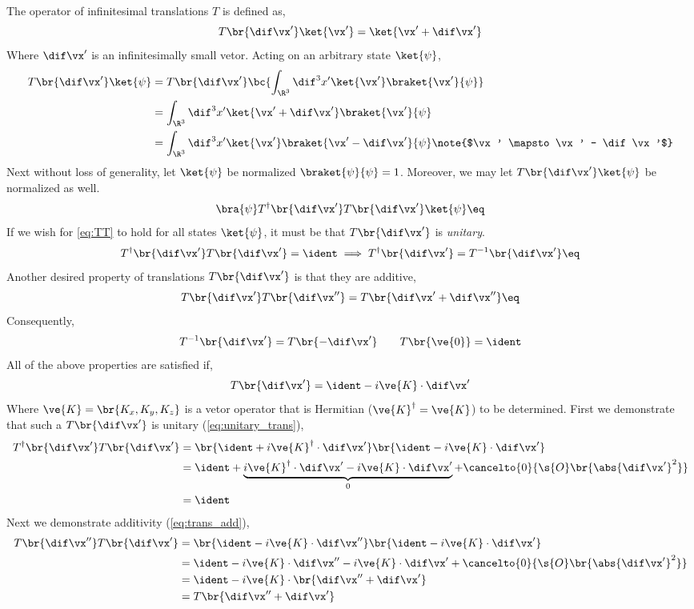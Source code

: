 \documentclass{article}
\begin{document}
The operator of infinitesimal translations $T$ is defined as,
\[ T\br{\dif \vx'}\ket{\vx'} = \ket{\vx' + \dif \vx'} \]
Where $\dif \vx'$ is an infinitesimally small vetor. Acting on an arbitrary state $\ket{\psi}$,
\begin{align*}
T\br{\dif \vx'}\ket{\psi} &= T\br{\dif \vx'} \bc{\int_{\R^3} \dif^3 x' \ket{\vx'} \braket{\vx'}{\psi}} \\
&= \int_{\R^3} \dif^3 x' \ket{\vx' + \dif \vx'} \braket{\vx'}{\psi} \\
&= \int_{\R^3} \dif^3 x' \ket{\vx'} \braket{\vx' - \dif \vx'}{\psi} \note{$\vx' \mapsto \vx' - \dif \vx'$}\\
\end{align*}
Next without loss of generality, let $\ket{\psi}$ be normalized $\braket{\psi}{\psi} = 1$. Moreover, we may let $T\br{\dif \vx'}\ket{\psi}$ be normalized as well.
\[ \bra{\psi}T^{\dagger}\br{\dif \vx'} T\br{\dif \vx'}\ket{\psi} \eq \label{eq:TT}\]
If we wish for \cref{eq:TT} to hold for all states $\ket{\psi}$, it must be that $T\br{\dif \vx'}$ is \textit{unitary}.
\[ T^{\dagger}\br{\dif \vx'} T\br{\dif \vx'} = \ident \implies T^{\dagger}\br{\dif \vx'} = T^{-1}\br{\dif \vx'} \eq\label{eq:unitary_trans}\]
Another desired property of translations $T\br{\dif \vx'}$ is that they are additive,
\[ T\br{\dif \vx'}T\br{\dif \vx''} = T\br{\dif \vx' + \dif \vx''} \eq \label{eq:trans_add}\]
Consequently,
\[ T^{-1}\br{\dif \vx'} = T\br{-\dif \vx'} \qquad T\br{\ve{0}} = \ident \]
All of the above properties are satisfied if,
\[ T\br{\dif \vx'} = \ident - i \ve{K} \cdot \dif \vx' \]
Where $\ve{K} = \br{K_x, K_y, K_z}$ is a vetor operator that is Hermitian ($\ve{K}^{\dagger} = \ve{K}$) to be determined. First we demonstrate that such a $T\br{\dif \vx'}$ is unitary (\cref{eq:unitary_trans}),
\begin{align*}
T^{\dagger}\br{\dif \vx'} T\br{\dif \vx'} &= \br{\ident + i \ve{K}^{\dagger} \cdot \dif \vx'}\br{\ident - i \ve{K} \cdot \dif \vx'} \\
&= \ident + \underbrace{i \ve{K}^{\dagger} \cdot \dif \vx' - i \ve{K} \cdot \dif \vx'}_{0} + \cancelto{0}{\s{O}\br{\abs{\dif \vx'}^2}} \\
&= \ident
\end{align*}
Next we demonstrate additivity (\cref{eq:trans_add}),
\begin{align*}
T\br{\dif \vx''} T\br{\dif \vx'} &= \br{\ident - i \ve{K} \cdot \dif \vx''}\br{\ident - i \ve{K} \cdot \dif \vx'} \\
&= \ident - i \ve{K} \cdot \dif \vx'' - i \ve{K} \cdot \dif \vx' + \cancelto{0}{\s{O}\br{\abs{\dif \vx'}^2}} \\
&= \ident - i \ve{K} \cdot \br{\dif \vx'' + \dif \vx'} \\
&= T\br{\dif \vx'' + \dif \vx'}
\end{align*}
\end{document}
